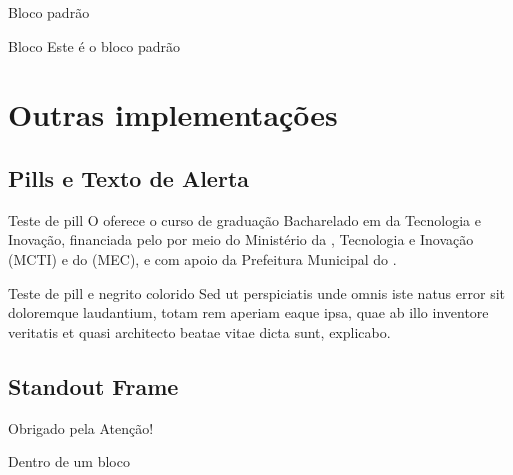 \documentclass[aspectratio=169]{beamer}
\begin{document}
\begin{frame}{Bloco padrão}

\begin{block}{Bloco}
    Este é o bloco padrão
\end{block}
    
\end{frame}

\section{Outras implementações}

\subsection{Pills e Texto de Alerta}

\begin{frame}{Teste de pill}
  O  oferece o curso de graduação Bacharelado em  da Tecnologia e Inovação, 
  financiada pelo  por meio do Ministério da , Tecnologia e Inovação (MCTI) 
  e do  (MEC), e com apoio da Prefeitura Municipal do .
\end{frame}

\begin{frame}{Teste de pill e negrito colorido}
   Sed ut perspiciatis unde omnis iste natus error sit  
   \alert{doloremque} laudantium, totam rem aperiam eaque ipsa, \alert{quae ab illo} inventore 
   veritatis et quasi architecto \alert{beatae vitae dicta sunt}, explicabo.
\end{frame}

\subsection{Standout Frame}

\begin{frame}[standout]
  Obrigado pela Atenção!
\end{frame}

\begin{frame}[standout]
  \begin{standoutbox}
    Dentro de um bloco
  \end{standoutbox}
\end{frame}
\end{document}
